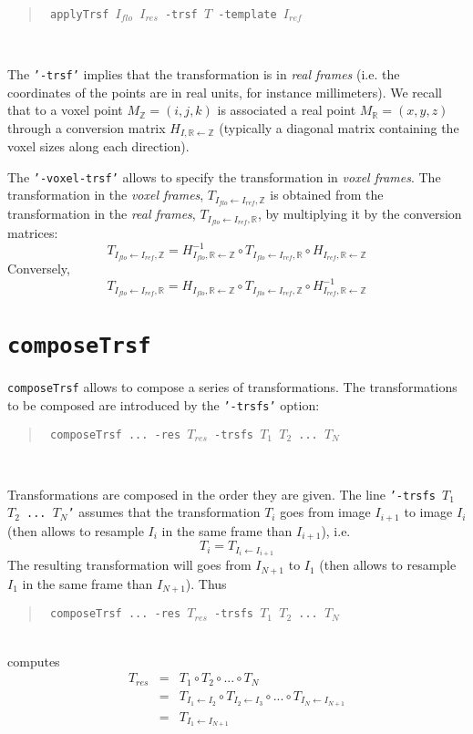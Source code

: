 \documentclass[10pt]{report}
\def\applyTrsf{\texttt{applyTrsf} }
\def\composeTrsf{\texttt{composeTrsf} }
\newcommand{\option}[1]{{\texttt{'#1'}}}
\newenvironment{code}[1]{\mbox{}\\[1ex]\hspace*{-#1cm}\begin{minipage}{150mm}\begin{quote}\tt}{\end{quote}\end{minipage}\mbox{}\\[1ex]}
\begin{document}
\begin{code}{0.8}
\% \applyTrsf $I_{flo}$ $I_{res}$ -trsf $T$ -template $I_{ref}$ \\
\end{code}

The \option{-trsf} implies that the transformation is in \textit{real frames} (i.e. the coordinates of the points are in real units, for instance millimeters). We recall that to a voxel point $M_{\mathbb{Z}} = (i,j,k)$ is associated a real point $M_{\mathbb{R}} = (x,y,z)$ through a conversion matrix $H_{I,\mathbb{R} \leftarrow \mathbb{Z}}$ (typically a diagonal matrix containing the voxel sizes along each direction).

The \option{-voxel-trsf} allows to specify the transformation in \textit{voxel frames}. The transformation in the \textit{voxel frames}, $T_{I_{flo} \leftarrow I_{ref}, \mathbb{Z}}$ is obtained from the transformation in the \textit{real frames}, $T_{I_{flo} \leftarrow I_{ref}, \mathbb{R}}$, by multiplying it by the conversion matrices:
$$
T_{I_{flo} \leftarrow I_{ref}, \mathbb{Z}} 
=
H^{-1}_{I_{flo},\mathbb{R} \leftarrow \mathbb{Z}} \circ
T_{I_{flo} \leftarrow I_{ref}, \mathbb{R}} \circ
H_{I_{ref},\mathbb{R} \leftarrow \mathbb{Z}}
$$
Conversely,
$$
T_{I_{flo} \leftarrow I_{ref}, \mathbb{R}} 
=
H_{I_{flo},\mathbb{R} \leftarrow \mathbb{Z}} \circ
T_{I_{flo} \leftarrow I_{ref}, \mathbb{Z}} \circ
H^{-1}_{I_{ref},\mathbb{R} \leftarrow \mathbb{Z}}
$$





\section{\composeTrsf}


\composeTrsf allows to compose a series of transformations. The transformations to be composed are introduced by the \option{-trsfs} option:
\begin{code}{1}
\% \composeTrsf ... -res $T_{res}$ -trsfs  $T_1$ $T_2$ ... $T_N$
\end{code}


Transformations are composed in the order they are given.
The line \option{-trsfs $T_1$ $T_2$ ... $T_N$} assumes that the transformation
$T_i$ goes from image $I_{i+1}$ to image $I_{i}$ (then allows to resample
$I_{i}$ in the same frame than $I_{i+1}$), i.e.  
$$T_{i} = T_{I_{i} \leftarrow I_{i+1}}$$
The resulting transformation will goes from $I_{N+1}$ to $I_1$ 
(then allows to resample $I_1$ in the same frame than $I_{N+1}$). Thus 
\begin{code}{1}
\% \composeTrsf ... -res $T_{res}$ -trsfs  $T_1$ $T_2$ ... $T_N$
\end{code}
computes
\begin{eqnarray*}
T_{res} & = & T_1 \circ T_2 \circ ... \circ T_N \\
& = & T_{I_{1} \leftarrow I_{2}} \circ  
      T_{I_{2} \leftarrow I_{3}} \circ  ... \circ 
      T_{I_{N} \leftarrow I_{N+1}} \\
& = & T_{I_{1} \leftarrow I_{N+1}} \\
\end{eqnarray*}
\end{document}
